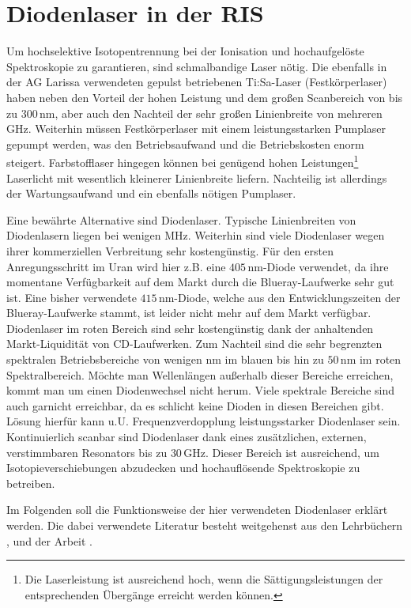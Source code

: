\section{Diodenlaser in der RIS}\label{sec:diodenlaser}
Um hochselektive Isotopentrennung bei der Ionisation und hochaufgelöste
Spektroskopie zu garantieren, sind schmalbandige Laser nötig. Die ebenfalls in
der AG Larissa verwendeten gepulst betriebenen Ti:Sa-Laser (Festkörperlaser)
haben neben den Vorteil der hohen Leistung und dem großen Scanbereich von bis
zu $300\,$nm, aber auch den Nachteil der sehr großen Linienbreite von mehreren
GHz.
Weiterhin müssen Festkörperlaser mit einem leistungsstarken Pumplaser gepumpt
werden, was den Betriebsaufwand und die Betriebskosten enorm steigert.
Farbstofflaser hingegen können bei genügend hohen
Leistungen\footnote{Die Laserleistung ist ausreichend hoch, wenn die
Sättigungsleistungen der entsprechenden Übergänge erreicht werden können.}
Laserlicht mit wesentlich kleinerer Linienbreite liefern. Nachteilig ist
allerdings der Wartungsaufwand und ein ebenfalls nötigen Pumplaser.\par
Eine bewährte Alternative sind Diodenlaser. Typische Linienbreiten von Diodenlasern liegen bei wenigen
MHz. Weiterhin sind viele Diodenlaser wegen ihrer
kommerziellen Verbreitung sehr kostengünstig. Für den ersten Anregungsschritt im
Uran wird hier z.B. eine $405\,$nm-Diode verwendet, da ihre momentane
Verfügbarkeit auf dem Markt durch die Blueray-Laufwerke sehr gut ist. Eine bisher verwendete
$415\,$nm-Diode, welche aus den Entwicklungszeiten der Blueray-Laufwerke stammt,
ist leider nicht mehr auf dem Markt verfügbar. Diodenlaser im roten Bereich sind
sehr kostengünstig dank der anhaltenden Markt-Liquidität von CD-Laufwerken. Zum
Nachteil sind die sehr begrenzten spektralen Betriebsbereiche von wenigen nm im blauen bis hin zu $50\,$nm im roten Spektralbereich. Möchte man Wellenlängen außerhalb dieser Bereiche erreichen, kommt man um einen
Diodenwechsel nicht herum. Viele spektrale Bereiche sind auch garnicht
erreichbar, da es schlicht keine Dioden in diesen Bereichen gibt. Lösung
hierfür kann u.U. Frequenzverdopplung leistungsstarker Diodenlaser sein.
Kontinuierlich scanbar sind Diodenlaser dank eines zusätzlichen, externen,
verstimmbaren Resonators bis zu $30\,$GHz. Dieser Bereich ist ausreichend, um Isotopieverschiebungen abzudecken und hochauflösende Spektroskopie zu betreiben.\par Im Folgenden soll die Funktionsweise der hier
verwendeten Diodenlaser erklärt werden. Die dabei verwendete Literatur besteht weitgehenst aus den
Lehrbüchern \cite{demtroeder:ex3}, \cite{chow:semiconductor-laser} und der
Arbeit \cite{schumann:2001:diplomarbeit}.

